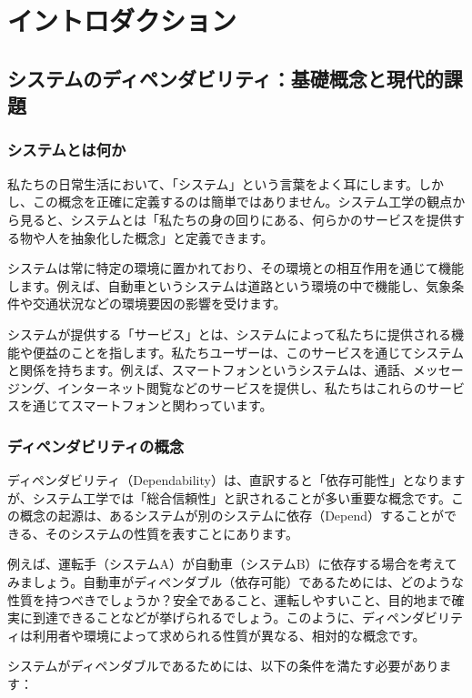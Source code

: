 \chapter{イントロダクション}
\label{chap1}

\section{システムのディペンダビリティ：基礎概念と現代的課題}

\subsection{システムとは何か}

私たちの日常生活において、「システム」という言葉をよく耳にします。しかし、この概念を正確に定義するのは簡単ではありません。システム工学の観点から見ると、システムとは「私たちの身の回りにある、何らかのサービスを提供する物や人を抽象化した概念」と定義できます。

システムは常に特定の環境に置かれており、その環境との相互作用を通じて機能します。例えば、自動車というシステムは道路という環境の中で機能し、気象条件や交通状況などの環境要因の影響を受けます。

システムが提供する「サービス」とは、システムによって私たちに提供される機能や便益のことを指します。私たちユーザーは、このサービスを通じてシステムと関係を持ちます。例えば、スマートフォンというシステムは、通話、メッセージング、インターネット閲覧などのサービスを提供し、私たちはこれらのサービスを通じてスマートフォンと関わっています。

\subsection{ディペンダビリティの概念}

ディペンダビリティ（Dependability）は、直訳すると「依存可能性」となりますが、システム工学では「総合信頼性」と訳されることが多い重要な概念です。この概念の起源は、あるシステムが別のシステムに依存（Depend）することができる、そのシステムの性質を表すことにあります。

例えば、運転手（システムA）が自動車（システムB）に依存する場合を考えてみましょう。自動車がディペンダブル（依存可能）であるためには、どのような性質を持つべきでしょうか？安全であること、運転しやすいこと、目的地まで確実に到達できることなどが挙げられるでしょう。このように、ディペンダビリティは利用者や環境によって求められる性質が異なる、相対的な概念です。

システムがディペンダブルであるためには、以下の条件を満たす必要があります：

